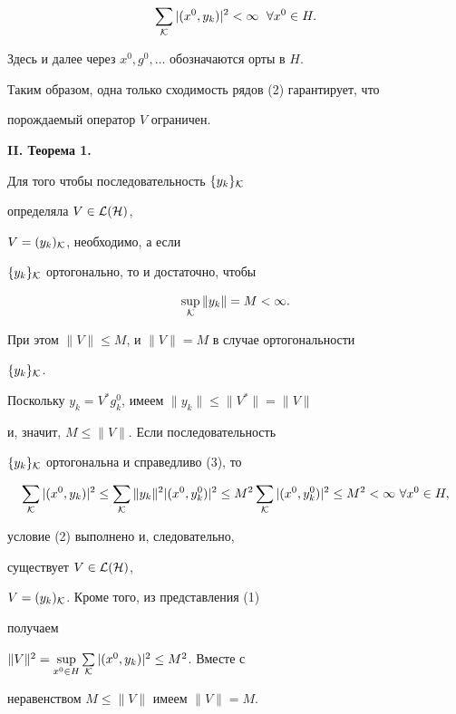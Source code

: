 \begin{equation} 


\sum_{\cal K}|(x^0,y_k)|^2<\infty\ \; \forall x^0\in H. 


\end{equation} 


Здесь и далее через $x^0,g^0,\dotsc$ обозначаются орты в $H$. 


Таким образом, одна только сходимость рядов (2) гарантирует, что 


порождаемый оператор $V$ ограничен. 


\medskip 


 


{\bf II. Теорема 1.} {\it 


Для того чтобы последовательность $\{y_k\}_{\cal K}$ 


определяла $V\in\cal L(H)$, 


$V=(y_k)_{\cal K}$, необходимо, а если 


$\{y_k\}_{\cal K}$ ортогонально, то и достаточно, чтобы 


\begin{equation} 


\sup_{\cal K}\|y_k\|=M<\infty. 


\end{equation} 


При этом $\|V\|\le M$, и $\|V\|=M$ в случае ортогональности 


$\{y_k\}_{\cal K}$. 


} 


\medskip 


\addtocounter{thm}{1} 


 


\begin{pf} 


Поскольку $y_k=V^*g^0_k$, имеем $\|y_k\|\le\|V^*\|=\|V\|$ 


и, значит, $M\le\|V\|$. Если последовательность 


$\{y_k\}_{\cal K}$ ортогональна и справедливо (3), то 


$$ 


\sum_{\cal K}|(x^0,y_k)|^2\le 


\sum_{\cal K}\|y_k\|^2|(x^0,y^0_k)|^2\le M^2 


\sum_{\cal K}|(x^0,y^0_k)|^2\le M^2<\infty\ \forall x^0\in H, 


$$ 


условие (2) выполнено и, следовательно, 


существует $V\in\cal L(H)$, 


$V=(y_k)_{\cal K}$. Кроме того, из представления (1) 


получаем 


$\|V\|^2=\sup\limits_{x^0\in H}\sum\limits_{\cal K} 


|(x^0,y_k)|^2\le M^2$. Вместе с 


неравенством $M\le \|V\|$ имеем $\|V\|=M$. 


\end{pf} 


